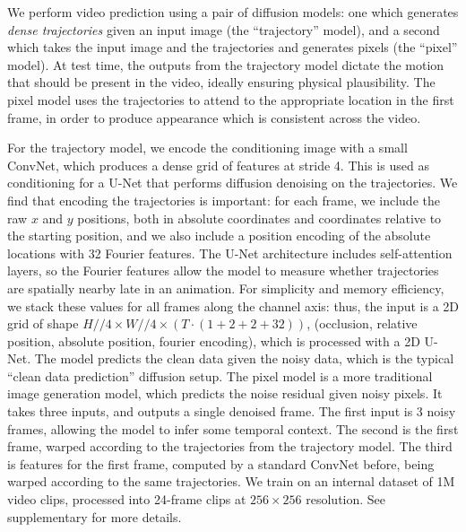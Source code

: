 \documentclass[10pt,twocolumn,letterpaper]{article}
\begin{document}
We perform video prediction using a pair of diffusion models: one which generates \emph{dense trajectories} given an input image (the ``trajectory'' model), and a second which takes the input image and the trajectories and generates pixels (the ``pixel'' model).  At test time, the outputs from the trajectory model dictate the motion that should be present in the video, ideally ensuring physical plausibility.
The pixel model uses the trajectories to attend to the appropriate location in the first frame, in order to produce appearance which is consistent across the video.  


For the trajectory model, we encode the conditioning image with a
small ConvNet, which produces a dense grid of features at stride 4.  This is used as conditioning for a U-Net that performs diffusion denoising on the trajectories.
We find that encoding the trajectories is important: for each frame, we include the raw $x$ and $y$ positions, both in absolute coordinates and coordinates relative to the starting position, and we also include a position encoding of the absolute locations with 32 Fourier features.  The U-Net architecture includes self-attention layers, so the Fourier features allow the model to measure whether trajectories are spatially nearby late in an animation.  
For simplicity and memory efficiency, we stack these values for all frames along the channel axis: thus, the input is a 2D grid of shape $H//4 \times W//4 \times (T \cdot (1+2+2+32))$, (occlusion, relative position, absolute position, fourier encoding), which is processed with a 2D U-Net.
The model predicts the clean data given the noisy data, which is the typical ``clean data prediction'' diffusion setup.  The pixel model is a more traditional image generation model, which predicts the noise residual given noisy pixels.  It takes three inputs, and outputs a single denoised frame.  The first input is 3 noisy frames, allowing the model to infer some temporal context.  The second is the first frame, warped according to the trajectories from the trajectory model.  The third is features for the first frame, computed by a standard ConvNet before, being warped according to the same trajectories.  We train on an internal dataset of 1M video clips, processed into 24-frame clips at $256\times 256$ resolution.  See supplementary for more details.
\end{document}
